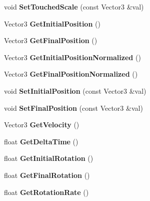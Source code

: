 \begin{DoxyCompactItemize}
void {\bfseries Set\+Touched\+Scale} (const Vector3 \&val)
\item 
\mbox{\label{classUIComponent_a272f84a2e00097ae8138374896d489ed}} 
Vector3 {\bfseries Get\+Initial\+Position} ()
\item 
\mbox{\label{classUIComponent_a25a886548f331f4668f5ae27faee0e71}} 
Vector3 {\bfseries Get\+Final\+Position} ()
\item 
\mbox{\label{classUIComponent_ad0850c699c44fda860915e1f35903fc6}} 
Vector3 {\bfseries Get\+Initial\+Position\+Normalized} ()
\item 
\mbox{\label{classUIComponent_a3539578ff8b52b827552d9701fa0a9c0}} 
Vector3 {\bfseries Get\+Final\+Position\+Normalized} ()
\item 
\mbox{\label{classUIComponent_a29a2e1cd9cc4ea8eb889152a962a9147}} 
void {\bfseries Set\+Initial\+Position} (const Vector3 \&val)
\item 
\mbox{\label{classUIComponent_a420d395a7e6f7cf6e8d06d5462c35318}} 
void {\bfseries Set\+Final\+Position} (const Vector3 \&val)
\item 
\mbox{\label{classUIComponent_a253ef99d479ddf08ab212852f1d00668}} 
Vector3 {\bfseries Get\+Velocity} ()
\item 
\mbox{\label{classUIComponent_a8c463e8fb54d3d6553373d5d275a1dc8}} 
float {\bfseries Get\+Delta\+Time} ()
\item 
\mbox{\label{classUIComponent_a3d3064b86d8204f75bd2b61ad45bb64c}} 
float {\bfseries Get\+Initial\+Rotation} ()
\item 
\mbox{\label{classUIComponent_a726eb48a423d5eced75e4c109051aea5}} 
float {\bfseries Get\+Final\+Rotation} ()
\item 
\mbox{\label{classUIComponent_aca6ee5c09157243fe13cecb665d4afa7}} 
float {\bfseries Get\+Rotation\+Rate} ()
\item 
\mbox{\label{classUIComponent_ab1dc46fe63d17c5520948e6a81764cd6}} 

\end{DoxyCompactItemize}
